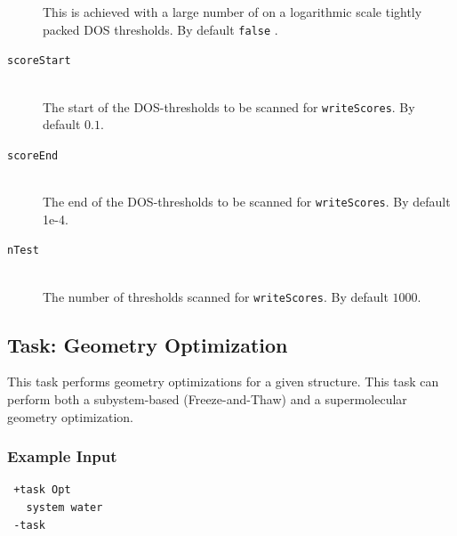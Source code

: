 \documentclass[bibliography=totocnumbered,a4paper,10pt,oneside]{scrbook}
\newcommand{\ttt}[1]{%
  \begingroup\setlength{\fboxsep}{1pt}%
  \colorbox{serenity-green!30}{\texttt{\hspace*{2pt}\vphantom{(g}#1\hspace*{2pt}}}%
  \endgroup
}
\begin{document}
\begin{description}
    This is achieved with a large number of on a logarithmic scale tightly packed DOS thresholds.
    By default \ttt{false}.
    \item [\texttt{scoreStart}]\hfill \\
    The start of the DOS-thresholds to be scanned for \texttt{writeScores}.
    By default $0.1$.
    \item [\texttt{scoreEnd}]\hfill \\
    The end of the DOS-thresholds to be scanned for \texttt{writeScores}.
    By default 1e-4.
    \item [\texttt{nTest}]\hfill \\
    The number of thresholds scanned for \texttt{writeScores}. By default $1000$.
 \end{description}

\subsection{Task: Geometry Optimization}
This task performs geometry optimizations for a given structure. This task can perform both a subystem-based (Freeze-and-Thaw) and a supermolecular geometry optimization.
\subsubsection{Example Input}
\begin{lstlisting}
 +task Opt
   system water
 -task
\end{lstlisting}
\end{document}
